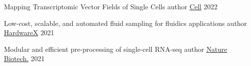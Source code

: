 \begin{cvhonors}
  \cvhonor
    {Mapping Transcriptomic Vector Fields of Single Cells} %
    {author} %
    {\href{https://doi.org/10.1016/j.cell.2021.12.045}{Cell}} %
    {2022} %

  \cvhonor
    {Low-cost, scalable, and automated fluid sampling for fluidics applications} %
    {author} %
    {\href{https://doi.org/10.1016/j.ohx.2021.e00201}{HardwareX}} %
    {2021} %

  \cvhonor
    {Modular and efficient pre-processing of single-cell RNA-seq} %
    {author} %
    {\href{https://doi.org/10.1038/s41587-021-00870-2}{Nature Biotech.}} %
    {2021} %
\end{cvhonors}

